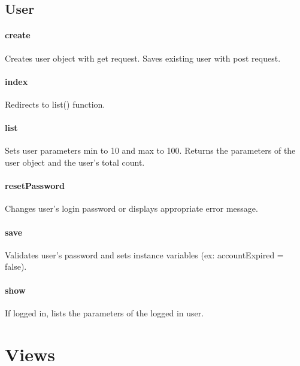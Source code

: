 \documentclass[12pt]{article}
\begin{document}
\subsection{User}\label{sec:CUser}
\paragraph{create} Creates user object with get request. Saves existing user with post request.
\paragraph{index} Redirects to list() function.
\paragraph{list} Sets user parameters min to 10 and max to 100. Returns the parameters of the user object and the user's total count.
\paragraph{resetPassword} Changes user's login password or displays appropriate error message.
\paragraph{save} Validates user's password and sets instance variables (ex: accountExpired = false).
\paragraph{show} If logged in, lists the parameters of the logged in user.


\section{Views}
\end{document}
